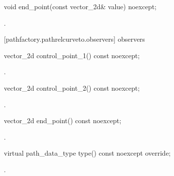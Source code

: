 \begin{itemdecl}
    void end_point(const vector_2d& value) noexcept;
\end{itemdecl}
\begin{itemdescr}
	\pnum
	\postconditions
	.
\end{itemdescr}

 [pathfactory.pathrelcurveto.observers]{ observers}

\begin{itemdecl}
    vector_2d control_point_1() const noexcept;
\end{itemdecl}
\begin{itemdescr}
	\pnum
	\returns
	.
\end{itemdescr}

\begin{itemdecl}
    vector_2d control_point_2() const noexcept;
\end{itemdecl}
\begin{itemdescr}
	\pnum
	\returns
	.
\end{itemdescr}

\begin{itemdecl}
    vector_2d end_point() const noexcept;
\end{itemdecl}
\begin{itemdescr}
	\pnum
	\returns
	.
\end{itemdescr}

\begin{itemdecl}
    virtual path_data_type type() const noexcept override;
\end{itemdecl}
\begin{itemdescr}
	\pnum
	\returns
	.
\end{itemdescr}
